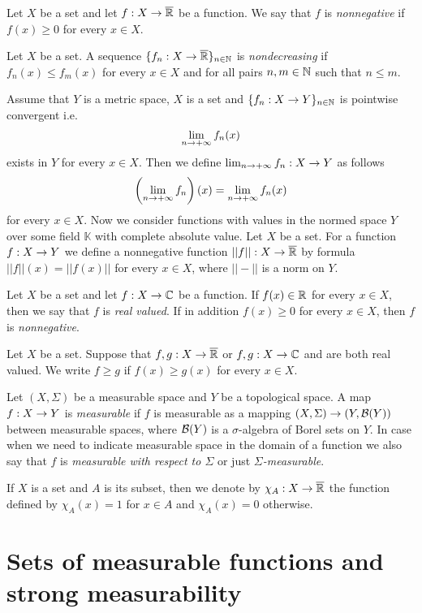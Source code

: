 \begin{definition}
Let $X$ be a set and let $f:X\rightarrow \overline{{\mathbb R}}$ be a function. We say that $f$ is \textit{nonnegative} if $f(x) \geq 0$ for every $x\in X$.
\end{definition}

\begin{definition}
Let $X$ be a set. A sequence $\{f_n:X\rightarrow \overline{{\mathbb R}}\}_{n\in {\mathbb N}}$ is \textit{nondecreasing} if $f_n(x) \leq f_m(x)$ for every $x\in X$ and for all pairs $n, m\in {\mathbb N}$ such that $n\leq m$.
\end{definition}
\noindent
Assume that $Y$ is a metric space, $X$ is a set and $\{f_n:X\rightarrow Y\}_{n\in {\mathbb N}}$ is pointwise convergent i.e.
$$\lim_{n\rightarrow +\infty}f_n(x)$$
exists in $Y$ for every $x\in X$. Then we define $\lim_{n\rightarrow +\infty}f_n:X\rightarrow Y$ as follows
$$\left(\lim_{n\rightarrow +\infty}f_n\right)(x) = \lim_{n\rightarrow +\infty}f_n(x)$$
for every $x\in X$. Now we consider functions with values in the normed space $Y$ over some field $\mathbb{K}$ with complete absolute value. Let $X$ be a set. For a function $f:X\rightarrow Y$ we define a nonnegative function $||f||:X\rightarrow \overline{{\mathbb R}}$ by formula $||f||(x) = ||f(x)||$ for every $x\in X$, where $||-||$ is a norm on $Y$.

\begin{definition}
Let $X$ be a set and let $f:X\rightarrow {\mathbb C}$ be a function. If $f(x)\in {\mathbb R}$ for every $x\in X$, then we say that $f$ is \textit{real valued}. If in addition $f(x)\geq 0$ for every $x\in X$, then $f$ is \textit{nonnegative}.
\end{definition}
\noindent
Let $X$ be a set. Suppose that $f,g:X\rightarrow \overline{{\mathbb R}}$ or $f,g:X\rightarrow {\mathbb C}$ and are both real valued. We write $f\geq g$ if $f(x)\geq g(x)$ for every $x\in X$.

\begin{definition}
Let $(X,\Sigma)$ be a measurable space and $Y$ be a topological space. A map $f:X\rightarrow Y$ is \textit{measurable} if $f$ is measurable as a mapping $(X,\Sigma)\rightarrow (Y,{\mathcal B}(Y))$ between measurable spaces, where ${\mathcal B}(Y)$ is a $\sigma$-algebra of Borel sets on $Y$. In case when we need to indicate measurable space in the domain of a function we also say that $f$ is \textit{measurable with respect to $\Sigma$} or just \textit{$\Sigma$-measurable}. 
\end{definition}
\noindent
If $X$ is a set and $A$ is its subset, then we denote by $\chi_A:X\rightarrow \overline{{\mathbb R}}$ the function defined by $\chi_A(x)=1$ for $x\in A$ and $\chi_A(x)=0$ otherwise.

\section{Sets of measurable functions and strong measurability}

